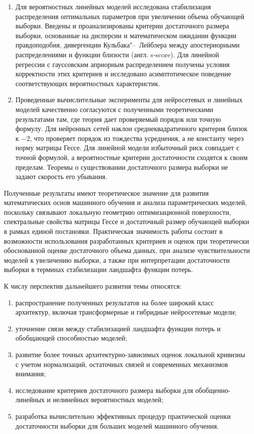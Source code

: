\begin{enumerate}[beginpenalty=10000]
    \item Для вероятностных линейных моделей исследована стабилизация распределения оптимальных параметров при увеличении объема обучающей выборки. Введены и проанализированы критерии достаточного размера выборки, основанные на дисперсии и математическом ожидании функции правдоподобия, дивергенции Кульбака"--~Лейблера между апостериорными распределениями и функции близости (англ. s-score). Для линейной регрессии с гауссовским априорным распределением получены условия корректности этих критериев и исследовано асимптотическое поведение соответствующих вероятностных характеристик.

    \item Проведенные вычислительные эксперименты для нейросетевых и линейных моделей качественно согласуются с полученными теоретическими результатами там, где теория дает проверяемый порядок или точную формулу. Для нейронных сетей наклон среднеквадратичного критерия близок к $-2$, что проверяет порядок из тождества усреднения, а не константу через норму матрицы Гессе. Для линейной модели избыточный риск совпадает с точной формулой, а вероятностные критерии достаточности сходятся к своим пределам. Теоремы о существовании достаточного размера выборки не задают скорость его убывания.
\end{enumerate}

Полученные результаты имеют теоретическое значение для развития математических основ машинного обучения и анализа параметрических моделей, поскольку связывают локальную геометрию оптимизационной поверхности, спектральные свойства матрицы Гессе и достаточный размер обучающей выборки в рамках единой постановки. Практическая значимость работы состоит в возможности использования разработанных критериев и оценок при теоретически обоснованной оценке достаточного объема данных, при анализе чувствительности моделей к увеличению выборки, а также при интерпретации достаточности выборки в терминах стабилизации ландшафта функции потерь.

К числу перспектив дальнейшего развития темы относятся:
\begin{enumerate}[beginpenalty=10000]
    \item распространение полученных результатов на более широкий класс архитектур, включая трансформерные и гибридные нейросетевые модели;
    \item уточнение связи между стабилизацией ландшафта функции потерь и обобщающей способностью моделей;
    \item развитие более точных архитектурно-зависимых оценок локальной кривизны с учетом нормализаций, остаточных связей и современных механизмов внимания;
    \item исследование критериев достаточного размера выборки для обобщенно-линейных и нелинейных вероятностных моделей;
    \item разработка вычислительно эффективных процедур практической оценки достаточности выборки для больших моделей машинного обучения.
\end{enumerate}


